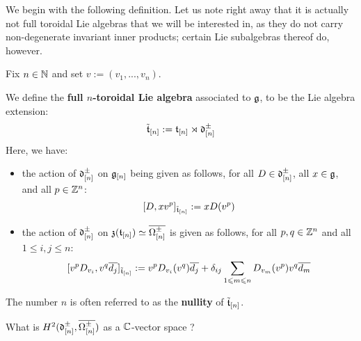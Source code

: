            We begin with the following definition. Let us note right away that it is actually not full toroidal Lie algebras that we will be interested in, as they do not carry non-degenerate invariant inner products; certain Lie subalgebras thereof do, however. 
            \begin{definition} \label{def: full_toroidal_lie_algebras}
                Fix $n \in \mathbb{N}$ and set $v := (v_1, ..., v_n)$. 
            
                We define the \textbf{full $n$-toroidal Lie algebra} associated to $\mathfrak{g}$, to be the Lie algebra extension:
                    $$\tilde{\mathfrak{t}}_{[n]} := \mathfrak{t}_{[n]} \rtimes \mathfrak{d}_{[n]}^{\pm}$$
                Here, we have:
                    \begin{itemize}
                        \item the action of $\mathfrak{d}_{[n]}^{\pm}$ on $\mathfrak{g}_{[n]}$ being given as follows, for all $D \in \mathfrak{d}_{[n]}^{\pm}$, all $x \in \mathfrak{g}$, and all $p \in \mathbb{Z}^n$:
                    $$[D, x v^p]_{ \tilde{\mathfrak{t}}_{[n]} } := x D( v^p )$$
                        \item the action of $\mathfrak{d}_{[n]}^{\pm}$ on $\mathfrak{z}(\mathfrak{t}_{[n]}) \simeq \overline{\Omega^{\pm}_{[n]}}$ is given as follows, for all $p, q \in \mathbb{Z}^n$ and all $1 \leq i, j \leq n$:
                            $$[ v^p D_{v_i}, v^q \overline{d_j} ]_{\tilde{\mathfrak{t}}_{[n]}} := v^p D_{v_i}(v^q) \overline{d_j} + \delta_{ij} \sum_{1 \leqslant m \leqslant n} D_{v_m}(v^p) v^q \overline{d_m}$$
                    \end{itemize}
                The number $n$ is often referred to as the \textbf{nullity} of $\tilde{\mathfrak{t}}_{[n]}$.
            \end{definition}
            \begin{question} \label{question: non_uniqueness_of_full_toroidal_lie_algebras}
                What is $H^2( \mathfrak{d}_{[n]}^{\pm}, \overline{\Omega^{\pm}_{[n]}} )$ as a $\mathbb{C}$-vector space ? 
            \end{question}
            
